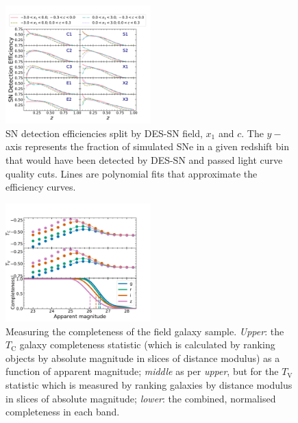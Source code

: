 \documentclass[fleqn,usenatbib]{mnras}
\begin{document}
\begin{figure}
    \centering
    
    \includegraphics[width=0.5\textwidth]{figs/SN_efficiencies_z_x1_c.pdf}
    \caption{ SN detection efficiencies split by DES-SN field, $x_1$ and $c$. The $y-$axis represents the fraction of simulated SNe in a given redshift bin that would have been detected by DES-SN and passed light curve quality cuts. Lines are polynomial fits that approximate the efficiency curves. 
    \label{fig:SN_efficiency}}
\end{figure}


\begin{figure}
    \centering
    \includegraphics[width=0.5\textwidth]{figs/completeness_combined.pdf}
    \caption{Measuring the completeness of the field galaxy sample. \textit{Upper}: the $T_{\mathrm{C}}$ galaxy completeness statistic (which is calculated by ranking objects by absolute magnitude in slices of distance modulus) as a function of apparent magnitude; \textit{middle} as per \textit{upper}, but for the $T_{\mathrm{V}}$ statistic which is measured by ranking galaxies by distance modulus in slices of absolute magnitude; \textit{lower}: the combined, normalised completeness in each band.  
    \label{fig:completeness}}
\end{figure}
\end{document}
